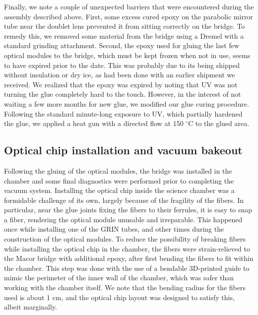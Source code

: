 Finally, we note a couple of unexpected barriers that were encountered during the assembly described above. First, some excess cured epoxy on the parabolic mirror tube near the doublet lens prevented it from sitting correctly on the bridge. To remedy this, we removed some material from the bridge using a Dremel with a standard grinding attachment. Second, the epoxy used for gluing the last few optical modules to the bridge, which must be kept frozen when not in use, seems to have expired prior to the date. This was probably due to its being shipped without insulation or dry ice, as had been done with an earlier shipment we received. We realized that the epoxy was expired by noting that UV was not turning the glue completely hard to the touch. However, in the interest of not waiting a few more months for new glue, we modified our glue curing procedure. Following the standard minute-long exposure to UV, which partially hardened the glue, we applied a heat gun with a directed flow at 150 $^{\circ}$C to the glued area. 

\subsection{Optical chip installation and vacuum bakeout}
Following the gluing of the optical modules, the bridge was installed in the chamber and some final diagnostics were performed prior to completing the vacuum system. Installing the optical chip inside the science chamber was a formidable challenge of its own, largely because of the fragility of the fibers. In particular, near the glue joints fixing the fibers to their ferrules, it is easy to snap a fiber, rendering the optical module unusable and irreparable. This happened once while installing one of the GRIN tubes, and other times during the construction of the optical modules. To reduce the possibility of breaking fibers while installing the optical chip in the chamber, the fibers were strain-relieved to the Macor bridge with additional epoxy, after first bending the fibers to fit within the chamber. This step was done with the use of a bendable 3D-printed guide to mimic the perimeter of the inner wall of the chamber, which was safer than working with the chamber itself. We note that the bending radius for the fibers used is about 1 cm, and the optical chip layout was designed to satisfy this, albeit marginally. 

